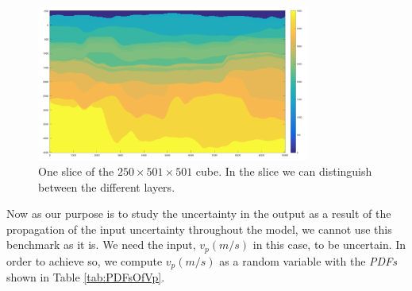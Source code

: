 \begin{figure}[H]
    \centering
    \includegraphics[width=0.8\textwidth]{images/velocity_field.png}
    \caption{One slice of the $250\times501\times501$ cube. In the slice we can distinguish between the different layers.}
    \label{fig:slice1}
\end{figure}

Now as our purpose is to study the uncertainty in the output as a result of the propagation of the input uncertainty throughout the model, we cannot use this benchmark as it is. We need the input, $v_{p}(m/s)$  in this case, to be uncertain. In order to achieve so, we compute $v_{p}(m/s)$ as a random variable with the \textit{PDFs} shown in Table \ref{tab:PDFsOfVp}.

